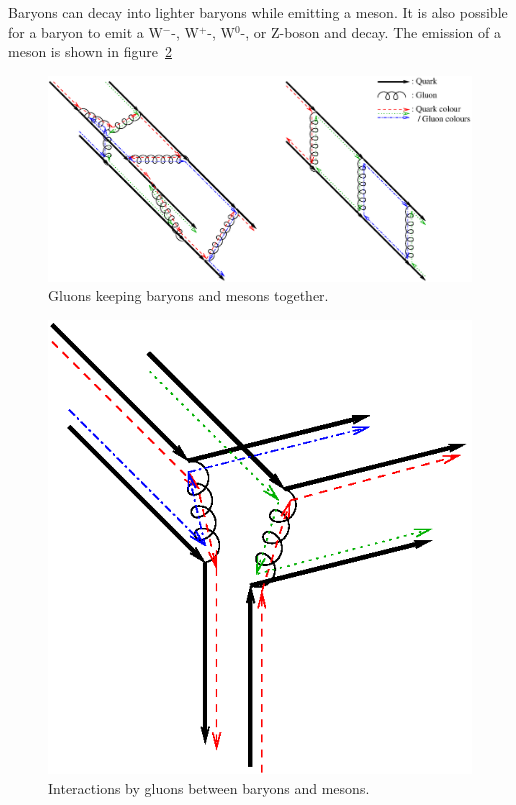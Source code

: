 \documentclass[12pt,a4paper]{article}
\numberwithin{equation}{section}
\numberwithin{figure}{section}
\numberwithin{table}{section}
\begin{document}
Baryons can decay into lighter baryons while emitting a meson. It is also possible for a baryon to emit a W$^-$-, W$^+$-, W$^0$-, or Z-boson and decay. The emission of a meson is shown in figure~\ref{fig:gluon2}

\begin{figure}\begin{center}
\includegraphics[scale=0.7]{gluon1.eps}%
\caption{Gluons keeping baryons and mesons together.}\label{fig:gluon1}
\end{center}\end{figure}

\begin{figure}\begin{center}
\includegraphics[scale=1]{gluon2.eps}%
\caption{Interactions by gluons between baryons and mesons.}\label{fig:gluon2}
\end{center}\end{figure}
\end{document}
